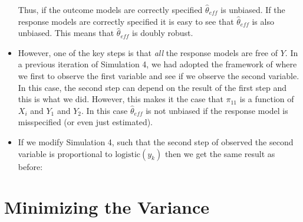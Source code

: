 \documentclass[12pt]{article}
\newcommand{\logistic}{{\text{logistic}}}
\begin{document}
\begin{itemize}
    Thus, if the outcome models are correctly specified $\hat \theta_{eff}$ is
    unbiased. If the response models are correctly specified it is easy to see
    that $\hat \theta_{eff}$ is also unbiased. This means that $\hat
    \theta_{eff}$ is doubly robust.

  \item However, one of the key steps is that \textit{all} the response
    models are free of $Y$. In a previous iteration of Simulation 4, we had
    adopted the framework of \cite{robins1997non} where we first to observe the
    first variable and see if we observe the second variable. In this case, the
    second step can depend on the result of the first step and this is what we
    did. However, this makes it the case that $\pi_11$ is a function of $X_i$
    and $Y_1$ and $Y_2$. In this case $\hat \theta_{eff}$ is not unbiased if the
    response model is misspecified (or even just estimated).

  \item If we modify Simulation 4, such that the second step of observed the
    second variable is proportional to $\logistic(y_k)$ then we get the same
    result as before:

    
    
    
  
\end{itemize}

\newpage

% 

\section*{Minimizing the Variance}
\end{document}
